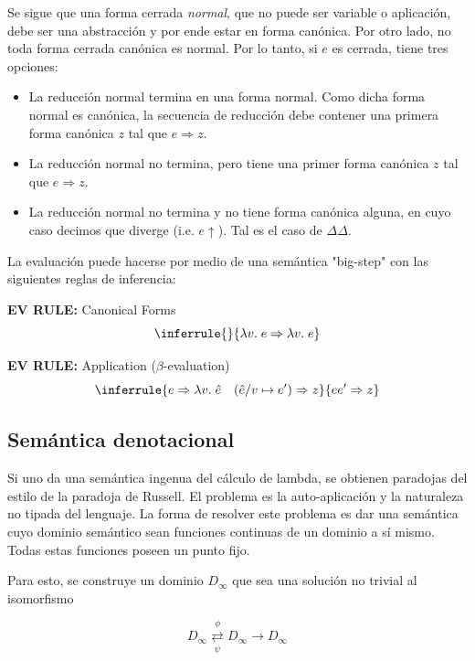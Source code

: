 \documentclass[article, 12pt]{article}
\begin{document}
Se sigue que una forma cerrada \textit{normal}, que no puede ser variable o
aplicación, debe ser una abstracción y por ende estar en forma canónica. Por
otro lado, no toda forma cerrada canónica es normal. Por lo tanto, si $e$ es
cerrada, tiene tres opciones:

\begin{itemize}
  \item La reducción normal termina en una forma normal. Como dicha forma normal
    es canónica, la secuencia de reducción debe contener una primera forma
    canónica $z$ tal que $e \Rightarrow z$.

  \item La reducción normal no termina, pero tiene una primer forma canónica $z$
    tal que $e \Rightarrow z$.

  \item La reducción normal no termina y no tiene forma canónica alguna, en cuyo
    caso decimos que diverge (i.e. $e \uparrow$). Tal es el caso de $\Delta
    \Delta$.
\end{itemize}

La evaluación puede hacerse por medio de una semántica "big-step" con las
siguientes reglas de inferencia:

\textbf{EV RULE:} Canonical Forms
\[
\inferrule{ }{ \lambda v.\; e \Rightarrow \lambda v.\; e }
\]

\textbf{EV RULE:} Application ($\beta$-evaluation)
\[
\inferrule
  { e \Rightarrow \lambda v.\; \hat{e} \quad (\hat{e}/ v \mapsto e') \Rightarrow z }
  { ee' \Rightarrow z }
\]
\subsection{Semántica denotacional}

Si uno da una semántica ingenua del cálculo de lambda, se obtienen paradojas del
estilo de la paradoja de Russell. El problema es la auto-aplicación y la
naturaleza no tipada del lenguaje. La forma de resolver este problema es dar una
semántica cuyo dominio semántico sean funciones continuas de un dominio a sí
mismo. Todas estas funciones poseen un punto fijo. 

Para esto, se construye un dominio $D_\infty$ que sea una solución no trivial al
isomorfismo

\begin{equation*}
  D_{\infty} \underset{\psi}{\overset{\phi}{\rightleftarrows}} D_\infty \to
  D_\infty
\end{equation*}
\end{document}
